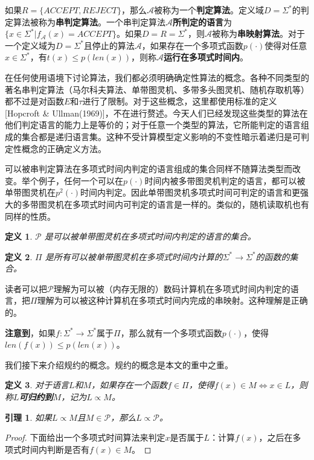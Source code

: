 \documentclass[twocolumn]{article}
\newtheorem{definition}{\hspace{2em}定义}
\newtheorem{lemma}{\hspace{2em}引理}
\theoremstyle{nonumberplain}%
\newtheorem{proof}{\hspace{2em}证明}
\begin{document}
    如果$R=\{ACCEPT,REJECT\}$，那么$\mathcal{A}$被称为一个{\bf 判定算法}。定义域$D=\Sigma^*$的判定算法被称为{\bf 串判定算法}。一个串判定算法$\mathcal{A}${\bf 所判定的语言}为$\{x\in\Sigma^*|f_\mathcal{A}(x)=ACCEPT\}$。如果$D=R=\Sigma^*$，则$\mathcal{A}$被称为{\bf 串映射算法}。对于一个定义域为$D=\Sigma^*$且停止的算法$\mathcal{A}$，如果存在一个多项式函数$p(\cdot)$使得对任意$x\in\Sigma^*$，有$t(x)\le p(len(x))$，则称$\mathcal{A}${\bf 运行在多项式时间内}。

    在任何使用语境下讨论算法，我们都必须明确确定性算法的概念。各种不同类型的著名串判定算法（马尔科夫算法、单带图灵机、多带多头图灵机、随机存取机等）都不过是对函数$E$和$\tau$进行了限制。对于这些概念，这里都使用标准的定义[Hopcroft \& Ullman(1969)]，不在进行赘述。今天人们已经发现这些类型的算法在他们判定语言的能力上是等价的；对于任意一个类型的算法，它所能判定的语言组成的集合都是递归语言集。这种不受计算模型定义影响的不变性暗示着递归是可判定性概念的正确定义方法。

    可以被串判定算法在多项式时间内判定的语言组成的集合同样不随算法类型而改变。举个例子，任何一个可以在$p(\cdot)$时间内被多带图灵机判定的语言，都可以被单带图灵机在$p^2(\cdot)$时间内判定。因此单带图灵机多项式时间可判定的语言和更强大的多带图灵机在多项式时间内可判定的语言是一样的。类似的，随机读取机也有同样的性质。
    \begin{definition}
        $\mathcal{P}$ 是可以被单带图灵机在多项式时间内判定的语言的集合。
    \end{definition}
    \begin{definition}
        $\Pi$ 是所有可以被单带图灵机在多项式时间内计算的$\Sigma^*\to\Sigma^*$的函数的集合。
    \end{definition}

    读者可以把$\mathcal{P}$理解为可以被（内存无限的）数码计算机在多项式时间内判定的语言，把$\Pi$理解为可以被这种计算机在多项式时间内完成的串映射。这种理解是正确的。

    {\bf 注意到}，如果$f:\Sigma^*\to\Sigma^*$属于$\Pi$，那么就有一个多项式函数$p(\cdot)$，使得$len(f(x))\le p(len(x))$。

    我们接下来介绍规约的概念。规约的概念是本文的重中之重。
    \begin{definition}
        对于语言$L$和$M$，如果存在一个函数$f\in\Pi$，使得$f(x)\in M \Leftrightarrow x\in L$，则称$L${\bf 可归约到}$M$，记为$L\propto M$。
    \end{definition}

    \begin{lemma}
        如果$L\propto M$且$M \in \mathcal{P}$，那么$L\propto\mathcal{P}$。
    \end{lemma}
    \begin{proof}
        下面给出一个多项式时间算法来判定$x$是否属于$L$：计算$f(x)$，之后在多项式时间内判断是否有$f(x)\in M$。
    \end{proof}
\end{document}
